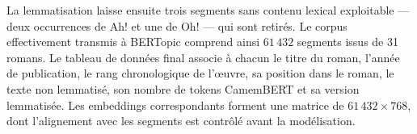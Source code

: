 La lemmatisation laisse ensuite trois segments sans contenu lexical exploitable --- deux occurrences de \og Ah!\fg{} et une de \og Oh!\fg{} --- qui sont retirés. Le corpus effectivement transmis à BERTopic comprend ainsi \(61\,432\) segments issus de 31 romans. Le tableau de données final associe à chacun le titre du roman, l'année de publication, le rang chronologique de l'œuvre, sa position dans le roman, le texte non lemmatisé, son nombre de tokens CamemBERT et sa version lemmatisée. Les embeddings correspondants forment une matrice de \(61\,432 \times 768\), dont l'alignement avec les segments est contrôlé avant la modélisation.
